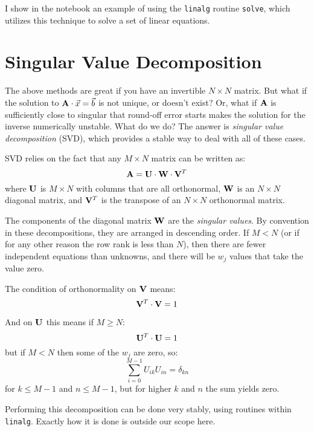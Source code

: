 I show in the notebook an example of using the {\tt linalg} routine
{\tt solve}, which utilizes this technique to solve a set of linear
equations. 

\section{Singular Value Decomposition}

The above methods are great if you have an invertible $N\times N$
matrix. But what if the solution to ${\bf A}\cdot \vec{x} = \vec{b}$
is not unique, or doesn't exist? Or, what if ${\bf A}$ is sufficiently
close to singular that round-off error starts makes the solution for
the inverse numerically unstable. What do we do? The answer is {\it
  singular value decomposition} (SVD), which provides a stable way to
deal with all of these cases.

SVD  relies on the fact that any $M\times N$ matrix can be written
as:
\begin{equation}
{\bf A} = {\bf U}\cdot{\bf W}\cdot{\bf V}^T
\end{equation}
where ${\bf U}$ is $M\times N$ with columns that are all orthonormal,
${\bf W}$ is an $N\times N$ diagonal matrix, and ${\bf V}^T$ is the
transpose of an $N \times N$ orthonormal matrix.

The components of the diagonal matrix ${\bf W}$ are the {\it singular
  values}.  By convention in these decompositions, they are arranged
in descending order. If $M<N$ (or if for any other reason the row rank
is less than $N$), then there are fewer independent equations than
unknowns, and there will be $w_j$ values that take the value zero.

The condition of orthonormality on ${\bf V}$ means:
\begin{equation}
{\bf V}^T \cdot {\bf V} = 1
\end{equation}

And on ${\bf U}$ this means if $M\ge N$:
\begin{equation}
{\bf U}^T \cdot {\bf U} = 1
\end{equation}
but if $M<N$ then some of the $w_j$ are zero, so:
\begin{equation}
\sum_{i=0}^{M-1} U_{ik} U_{in} = \delta_{kn}
\end{equation}
for $k\le M-1$ and $n\le M-1$, but for higher $k$ and $n$ the sum
yields zero.

Performing this decomposition can be done very stably, using routines
within {\tt linalg}. Exactly how it is done is outside our scope here. 


